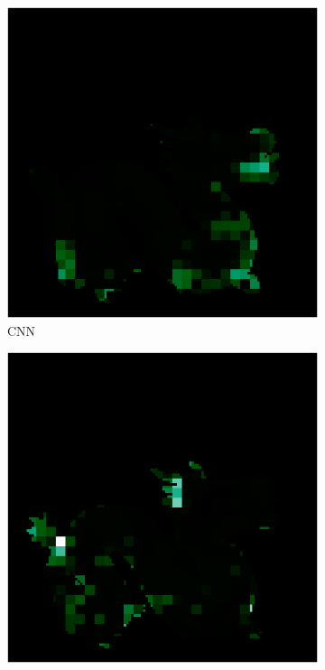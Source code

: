 \begin{figure}[H]
\begin{minipage}{0.32\linewidth}
\begin{subfigure}[t]{0.45\linewidth}
		\end{subfigure}
		
		\begin{subfigure}[t]{0.45\linewidth}
			\includegraphics[width=\linewidth]{./Figures/feature_map_gcnn/feature_map_gcnn-cnn_11.png}
			\caption{CNN}
		\end{subfigure}
		\begin{subfigure}[t]{0.45\linewidth}
			\includegraphics[width=\linewidth]{./Figures/feature_map_gcnn/feature_map_gcnn-cnn_4.png}

\end{subfigure}
\end{minipage}
\end{figure}
